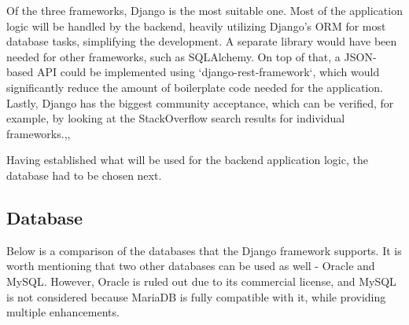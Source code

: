 Of the three frameworks, Django is the most suitable one.
Most of the application logic will be handled by the backend, heavily utilizing
Django's ORM for most database tasks, simplifying the development. A separate library would
have been needed for other frameworks, such as SQLAlchemy\cite{sqlalchemy}.
On top of that, a JSON-based API could be implemented using `django-rest-framework`,
which would significantly reduce the amount of boilerplate code needed for the application.
Lastly, Django has the biggest community acceptance, which can be verified, for example, by looking at the
StackOverflow\cite{stackoverflow} search results for individual frameworks.\cite{so_fastapi},\cite{so_django},\cite{so_flask}

Having established what will be used for the backend application logic, the database had to be chosen next.

\subsection{Database}
Below is a comparison of the databases that the Django framework supports.
It is worth mentioning that two other databases can be used as well - Oracle and MySQL.
However, Oracle is ruled out due to its commercial license, and MySQL is not considered because
MariaDB is fully compatible with it, while providing multiple enhancements.

